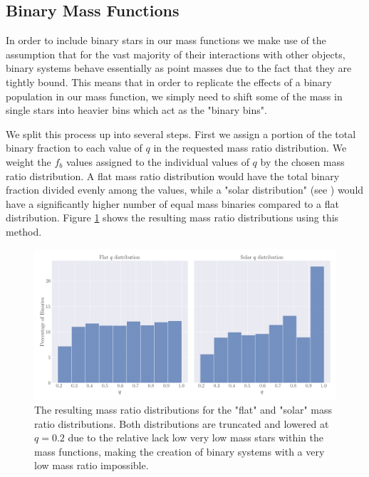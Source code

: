 \subsection{Binary Mass Functions}

In order to include binary stars in our mass functions we make use of the assumption that for the
vast majority of their interactions with other objects, binary systems behave essentially as point
masses due to the fact that they are tightly bound. This means that in order to replicate the
effects of a binary population in our mass function, we simply need to shift some of the mass in
single stars into heavier bins which act as the "binary bins".


We split this process up into several steps. First we assign a portion of the total binary fraction
to each value of $q$ in the requested mass ratio distribution. We weight the $f_b$ values assigned
to the individual values of $q$ by the chosen mass ratio distribution. A flat mass ratio
distribution would have the total binary fraction divided evenly among the values, while a "solar
distribution" (see \citealt{Reggiani2013}) would have a significantly higher number of equal mass
binaries compared to a flat distribution. Figure \ref{fig:2/q-dists} shows the resulting mass ratio
distributions using this method.





\begin{figure}
    \centering
    \includegraphics[width=\textwidth]{figures/q-dists.png}
    \caption{The resulting mass ratio distributions for the "flat" and "solar" mass ratio
        distributions. Both distributions are truncated and lowered at $q=0.2$ due to the relative
        lack low very low mass stars within the mass functions, making the creation of binary
        systems with a very low mass ratio impossible.}
    \label{fig:2/q-dists}
\end{figure}


